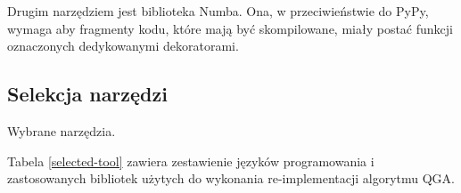\documentclass[11pt, a4paper]{article}
\begin{document}
\begin{sloppypar}

    Drugim narzędziem jest biblioteka Numba\cite{Numba_Article}\cite{Numba_Doc}. Ona, w przeciwieństwie
    do PyPy, wymaga aby fragmenty kodu, które mają być skompilowane, miały postać
    funkcji oznaczonych dedykowanymi dekoratorami.



    \subsection{Selekcja narzędzi}
    \FloatBarrier
    \begin{table}[ht]
      \centering
      
      \caption{Wybrane narzędzia.}
      \label{selected-tool}
    \end{table}
    \FloatBarrier

    Tabela \ref{selected-tool} zawiera zestawienie języków programowania i zastosowanych
    bibliotek użytych do wykonania re-implementacji algorytmu QGA.


\end{sloppypar}
\end{document}
